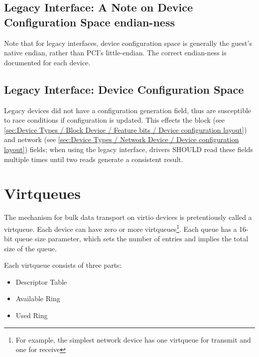 \subsection{Legacy Interface: A Note on Device Configuration Space endian-ness}\label{sec:Basic Facilities of a Virtio Device / Device Configuration Space / Legacy Interface: A Note on Configuration Space endian-ness}

Note that for legacy interfaces, device configuration space is generally the
guest's native endian, rather than PCI's little-endian.
The correct endian-ness is documented for each device.

\subsection{Legacy Interface: Device Configuration Space}\label{sec:Basic Facilities of a Virtio Device / Device Configuration Space / Legacy Interface: Device Configuration Space}

Legacy devices did not have a configuration generation field, thus are
susceptible to race conditions if configuration is updated.  This
effects the block  (see \ref{sec:Device Types /
Block Device / Feature bits / Device configuration layout}) and
network  (see \ref{sec:Device Types / Network Device /
Device configuration layout}) fields;
when using the legacy interface, drivers SHOULD
read these fields multiple times until two reads generate a consistent
result.

\section{Virtqueues}\label{sec:Basic Facilities of a Virtio Device / Virtqueues}

The mechanism for bulk data transport on virtio devices is
pretentiously called a virtqueue. Each device can have zero or more
virtqueues\footnote{For example, the simplest network device has one virtqueue for
transmit and one for receive}.  Each queue has a 16-bit queue size
parameter, which sets the number of entries and implies the total size
of the queue.

Each virtqueue consists of three parts:

\begin{itemize}
\item Descriptor Table
\item Available Ring
\item Used Ring
\end{itemize}

